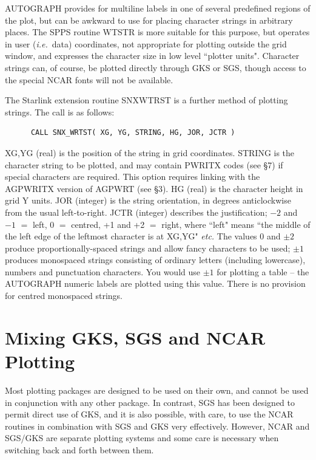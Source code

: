 \documentclass[twoside,11pt]{article}
\renewcommand{\_}{\texttt{\symbol{95}}}
\begin{document}
AUTOGRAPH provides for multiline labels in one of several
predefined regions of the plot, but can be awkward to use for
placing character strings in arbitrary places.
The SPPS routine WTSTR is more suitable for this purpose, but
operates in user ({\em i.e.}\ data) coordinates, not appropriate for
plotting outside the grid window, and expresses the character
size in low level ``plotter units".
Character strings can, of course, be plotted directly
through GKS or SGS, though access to the special NCAR fonts
will not be available.

The Starlink extension routine SNX\_WTRST is a further method
of plotting strings.
The call is as follows:

\begin{verbatim}
      CALL SNX_WRTST( XG, YG, STRING, HG, JOR, JCTR )
\end{verbatim}

XG,YG (real) is the position of the string in grid coordinates.
STRING is the character string to be plotted, and may contain PWRITX codes
(see \S 7) if special characters are required.
This option requires linking with the AGPWRITX
version of AGPWRT (see \S 3).
HG (real) is the character height in grid Y units.
JOR (integer) is the string orientation, in degrees anticlockwise from
the usual left-to-right.
JCTR (integer) describes the justification; $-2$ and $-1$ $=$ left,
0 $=$ centred, +1 and +2 $=$ right, where ``left" means ``the middle of
the left edge of the leftmost character is at XG,YG" {\em etc.}
The values 0 and $\pm2$ produce proportionally-spaced strings and
allow fancy characters to be used;
$\pm1$ produces monospaced strings consisting of ordinary letters
(including lowercase), numbers and punctuation characters.
You would use $\pm1$ for plotting a table --
the AUTOGRAPH numeric labels are plotted using this value.
There is no provision for centred monospaced strings.


\section {Mixing GKS, SGS and NCAR Plotting}

Most plotting packages are designed to be used on their own,
and cannot be used in conjunction with any other package.
In contrast, SGS has been designed to permit direct use of
GKS, and it is also possible, with care, to use the NCAR routines
in combination with SGS and GKS very effectively.
However, NCAR and SGS/GKS are separate plotting systems and some
care is necessary when switching back and forth between them.
\end{document}
